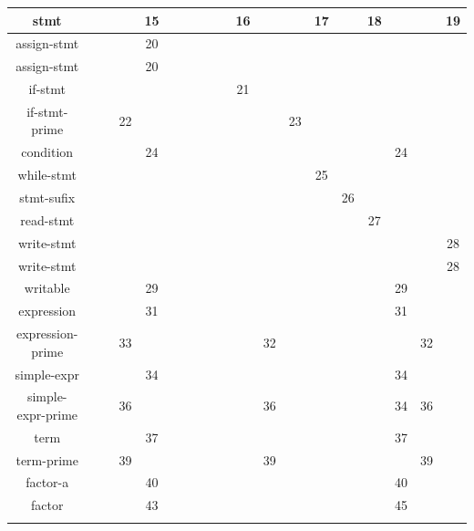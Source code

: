 {\begin{landscape}
\begin{adjustwidth}{-2cm}{}
\begin{tabular}{|c | c | c| c | c | c | c | c | c |c | c | c| c | c | c | c | c | c | c |}
  stmt & & &  & 15 &  &  &  & &  & 16 &  &  & 17 &  & 18 & & & 19  \\ 
 \hline
  assign-stmt & & &  & 20 &  &  &  & &  &  &  &  &  &  &  & & &   \\ 
 \hline
  assign-stmt & & &  & 20 &  &  &  & &  &  &  &  &  &  &  & & &   \\ 
 \hline
  if-stmt & & &  &  &  &  &  & &  & 21 &  &  &  &  &  & & &   \\ 
 \hline 
  if-stmt-prime & & & 22 &  &  &  &  & &  &  &  & 23 &  &  &  & & &   \\ 
 \hline
  condition & & & & 24 & & & & & & & & & & & & 24 & &   \\ 
 \hline
 while-stmt & & & & & & & & & & & & & 25 & & & & &   \\ 
 \hline
 stmt-sufix & & & & & & & & & & & & & & 26 & & & &   \\ 
\hline
 read-stmt & & & & & & & & & & & & & & & 27 & & &   \\ 
\hline
 write-stmt & & & & & & & & & & & & & & & & & & 28  \\ 
\hline
 write-stmt & & & & & & & & & & & & & & & & & & 28  \\ 
\hline
 writable & & & & 29 & & & & & & & & & & & & 29 & &  \\
 \hline
 expression & & & & 31 & & & & & & & & & & & & 31 & &  \\
 \hline
 expression-prime & & & 33 & & & & & & & & 32 & & & & & & 32 & \\
 \hline
 simple-expr & & & & 34 & & & & & & & & & & & & 34 & & \\
 \hline
 simple-expr-prime & & & 36 &  & & & & & & & 36 & & & & & 34 & 36 & \\
 \hline
 term & & &  & 37 & & & & & & &  & & & & & 37 &  & \\
 \hline
 term-prime & & & 39 & & & & & & & & 39 & & & & & & 39 & \\
 \hline
 factor-a & & & & 40 & & & & & & & & & & & & 40 & & \\
 \hline
 factor & & & & 43 & & & & & & & & & & & & 45 & & \\
 
 \hline\\
        \end{tabular}
    \end{adjustwidth}{}{}
    \end{landscape}
    \clearpage%
}




